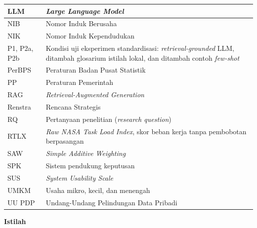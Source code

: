 {\begin{longtable}{|L{0.17\textwidth}|L{0.72\textwidth}|}
LLM & \textit{Large Language Model} \\ \hline
NIB & Nomor Induk Berusaha \\ \hline
NIK & Nomor Induk Kependudukan \\ \hline
P1, P2a, P2b & Kondisi uji eksperimen standardisasi: \textit{retrieval-grounded} LLM, ditambah glosarium istilah lokal, dan ditambah contoh \textit{few-shot} \\ \hline
PerBPS & Peraturan Badan Pusat Statistik \\ \hline
PP & Peraturan Pemerintah \\ \hline
RAG & \textit{Retrieval-Augmented Generation} \\ \hline
Renstra & Rencana Strategis \\ \hline
RQ & Pertanyaan penelitian (\textit{research question}) \\ \hline
RTLX & \textit{Raw NASA Task Load Index}, skor beban kerja tanpa pembobotan berpasangan \\ \hline
SAW & \textit{Simple Additive Weighting} \\ \hline
SPK & Sistem pendukung keputusan \\ \hline
SUS & \textit{System Usability Scale} \\ \hline
UMKM & Usaha mikro, kecil, dan menengah \\ \hline
UU PDP & Undang-Undang Pelindungan Data Pribadi \\ \hline
\end{longtable}
}

\vspace{1em}
\noindent\textbf{Istilah}

